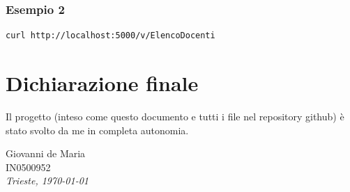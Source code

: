 \documentclass[a4paper, 10pt, oneside]{article} %
\begin{document}
\subsubsection*{Esempio 2}
\begin{lstlisting}[language=bash]
curl http://localhost:5000/v/ElencoDocenti
\end{lstlisting}



\section{Dichiarazione finale}

Il progetto (inteso come questo documento e tutti i file nel repository github) è stato svolto da me in completa autonomia.

\bigskip

\begin{flushleft}
Giovanni de Maria\\
IN0500952\\
\textit{Trieste, \today}
\end{flushleft}
\end{document}

